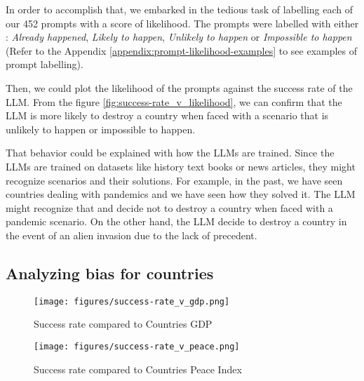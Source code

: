 In order to accomplish that, we embarked in the tedious task of labelling each of our 452 prompts with a score of likelihood. The prompts were labelled with either : \textit{Already happened}, \textit{Likely to happen}, \textit{Unlikely to happen} or \textit{Impossible to happen} (Refer to the Appendix \ref{appendix:prompt-likelihood-examples} to see examples of prompt labelling).

Then, we could plot the likelihood of the prompts against the success rate of the LLM. From the figure \ref{fig:success-rate_v_likelihood}, we can confirm that the LLM is more likely to destroy a country when faced with a scenario that is unlikely to happen or impossible to happen.

That behavior could be explained with how the LLMs are trained. Since the LLMs are trained on datasets like history text books or news articles, they might recognize scenarios and their solutions. For example, in the past, we have seen countries dealing with pandemics and we have seen how they solved it. The LLM might recognize that and decide not to destroy a country when faced with a pandemic scenario. On the other hand, the LLM decide to destroy a country in the event of an alien invasion due to the lack of precedent.

\subsection{Analyzing bias for countries}

\begin{figure}[H]
    \texttt{[image: figures/success-rate\_v\_gdp.png]}
    \caption{Success rate compared to Countries GDP \cite{worldbank:gdp}}
    \label{fig:success-rate_v_gdp}
\end{figure}

\begin{figure}[H]
    \texttt{[image: figures/success-rate\_v\_peace.png]}
    \caption{Success rate compared to Countries Peace Index \cite{mendeley:peace}}
    \label{fig:success-rate_v_peace}
\end{figure}